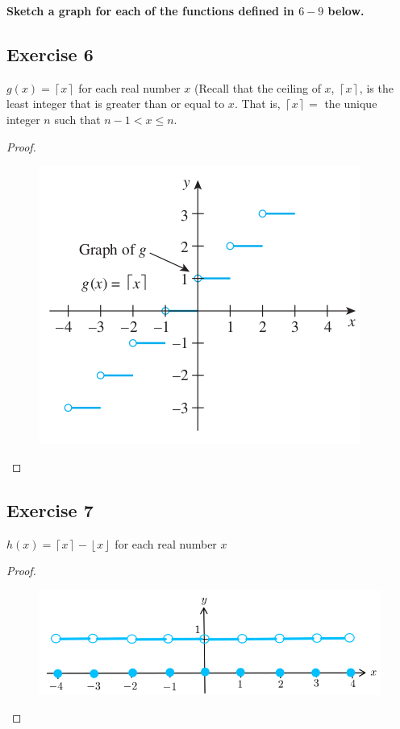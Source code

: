 \documentclass[14pt]{extarticle}
\newcommand{\cy}{\color{cyan}}
\newcommand{\floor}[1]{{\left\lfloor#1\right\rfloor}}
\newcommand{\ceil}[1]{{\left\lceil#1\right\rceil}}
\begin{document}
{\bf \cy Sketch a graph for each of the functions defined in \(6-9\) below.}

\subsection{Exercise 6}
\(g(x) = \ceil{x}\) for each real number \(x\) (Recall that the ceiling of \(x\), \(\ceil{x}\), is the least integer that 
is greater than or equal to \(x\). That is, \(\ceil{x} =\) the unique integer \(n\) such that \(n-1 < x \leq n\).

\begin{proof}
\begin{figure}[ht!]
\centering
\includegraphics[scale=0.5]{../images/11.1.6.png}
\end{figure}
\end{proof}

\subsection{Exercise 7}
\(h(x) = \ceil{x} - \floor{x}\) for each real number \(x\)

\begin{proof}
\begin{figure}[ht!]
\centering
\includegraphics[scale=0.5]{../images/11.1.7.png}
\end{figure}
\end{proof}
\end{document}
